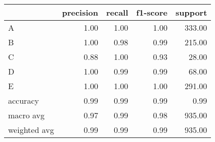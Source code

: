 \begin{tabular}{|l|r|r|r|r|}
\hline
{} &  precision &  recall &  f1-score &  support \\
\hline
A            &       1.00 &    1.00 &      1.00 &   333.00 \\
B            &       1.00 &    0.98 &      0.99 &   215.00 \\
C            &       0.88 &    1.00 &      0.93 &    28.00 \\
D            &       1.00 &    0.99 &      0.99 &    68.00 \\
E            &       1.00 &    1.00 &      1.00 &   291.00 \\
accuracy     &       0.99 &    0.99 &      0.99 &     0.99 \\
macro avg    &       0.97 &    0.99 &      0.98 &   935.00 \\
weighted avg &       0.99 &    0.99 &      0.99 &   935.00 \\
\hline
\end{tabular}
